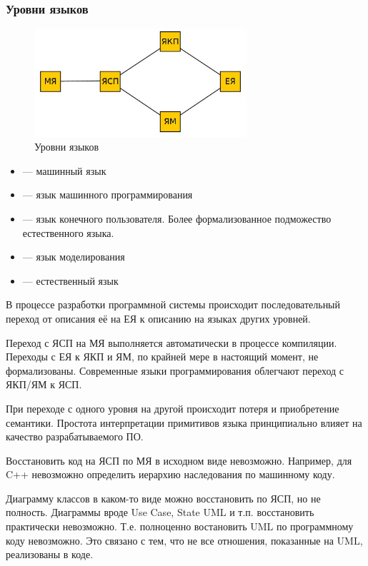 \documentclass[a4paper, 14pt]{extarticle}
\begin{document}
\subsubsection*{Уровни языков}
\begin{figure}[h]
    \centering
    \includegraphics[width=0.7\textwidth]{./img/L1/S001.jpg}
    \caption{Уровни языков}%
    \label{img:l1:1}
\end{figure}

\begin{itemize}
    \item {} --- машинный язык
    \item {} --- язык машинного программирования
    \item {} --- язык конечного пользователя. Более формализованное подможество естественного языка. 
    \item {} --- язык моделирования
    \item {} --- естественный язык 
\end{itemize}

В процессе разработки программной системы происходит последовательный переход от описания её на ЕЯ к описанию на языках других уровней.

Переход с ЯСП на МЯ выполняется автоматически в процессе компиляции. Переходы с ЕЯ к ЯКП и ЯМ, по крайней мере в настоящий момент, не формализованы. Современные языки программирования облегчают переход с ЯКП/ЯМ к ЯСП.

При переходе с одного уровня на другой происходит потеря и приобретение семантики. Простота интерпретации примитивов языка принципиально влияет на качество разрабатываемого ПО.

Восстановить код на ЯСП по МЯ в исходном виде невозможно. Например, для C++ невозможно определить иерархию наследования по машинному коду.

Диаграмму классов в каком-то виде можно восстановить по ЯСП, но не полность. Диаграммы вроде Use Case, State UML и т.п. восстановить практически невозможно. Т.е. полноценно востановить UML по программному коду невозможно. Это связано с тем, что не все отношения, показанные на UML, реализованы в коде.
\end{document}
